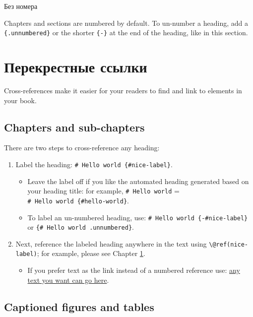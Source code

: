 \documentclass[
  12pt,
  a4paper,
]{book}
\providecommand{\tightlist}{%
  \setlength{\itemsep}{0pt}\setlength{\parskip}{0pt}}
\theoremstyle{definition}
\theoremstyle{definition}
\theoremstyle{definition}
\theoremstyle{definition}
\theoremstyle{remark}
\begin{document}
Без номера

Chapters and sections are numbered by default. To un-number a heading, add a \texttt{\{.unnumbered\}} or the shorter \texttt{\{-\}} at the end of the heading, like in this section.

\chapter{Перекрестные ссылки}\label{cross}

Cross-references make it easier for your readers to find and link to elements in your book.

\section{Chapters and sub-chapters}\label{chapters-and-sub-chapters}

There are two steps to cross-reference any heading:

\begin{enumerate}
\def\labelenumi{\arabic{enumi}.}
\tightlist
\item
  Label the heading: \texttt{\#\ Hello\ world\ \{\#nice-label\}}.

  \begin{itemize}
  \tightlist
  \item
    Leave the label off if you like the automated heading generated based on your heading title: for example, \texttt{\#\ Hello\ world} = \texttt{\#\ Hello\ world\ \{\#hello-world\}}.
  \item
    To label an un-numbered heading, use: \texttt{\#\ Hello\ world\ \{-\#nice-label\}} or \texttt{\{\#\ Hello\ world\ .unnumbered\}}.
  \end{itemize}
\item
  Next, reference the labeled heading anywhere in the text using \texttt{\textbackslash{}@ref(nice-label)}; for example, please see Chapter \ref{cross}.

  \begin{itemize}
  \tightlist
  \item
    If you prefer text as the link instead of a numbered reference use: \hyperref[cross]{any text you want can go here}.
  \end{itemize}
\end{enumerate}

\section{Captioned figures and tables}\label{captioned-figures-and-tables}
\end{document}
